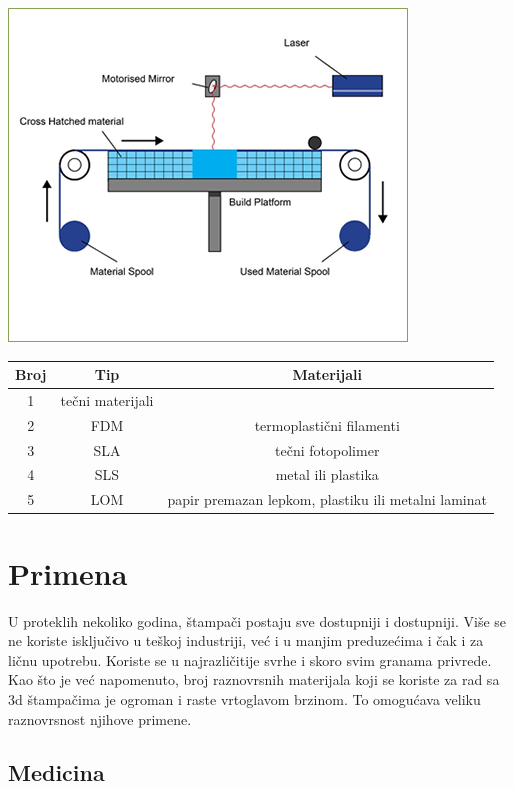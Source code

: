 \documentclass[a4paper]{article}
\begin{document}
{\begin{center}
\includegraphics[width=.5\textwidth ]{Tehnikeslike/LOM.jpg}
\end{center}

\begin{center}
\begin{tabular}{||c c c ||} 
 \hline
 Broj & Tip  & Materijali \\ [1ex] 
 \hline\hline
 1 & tečni materijali  &\\ 
 \hline
 2 & FDM & termoplastični filamenti \\
 \hline
 3 & SLA & tečni fotopolimer\\
 \hline
 4 & SLS & metal ili plastika\\
 \hline
 5 & LOM & papir premazan lepkom, plastiku ili metalni laminat\\ [1ex] 
 \hline
\end{tabular}
\end{center}

\newpage

\section{Primena}
\label{sec:Primena}

U proteklih nekoliko godina, štampači postaju sve dostupniji i dostupniji. Više se ne koriste isključivo u teškoj industriji, već i u manjim preduzećima i čak i za ličnu upotrebu. Koriste se u najrazličitije svrhe i skoro svim granama privrede. Kao što je već napomenuto, broj raznovrsnih materijala koji se koriste za rad sa 3d štampačima je ogroman i raste vrtoglavom brzinom. To omogućava veliku raznovrsnost njihove primene. 

\subsection{Medicina}
\label{subsec:podnaslov6}

}
\end{document}
